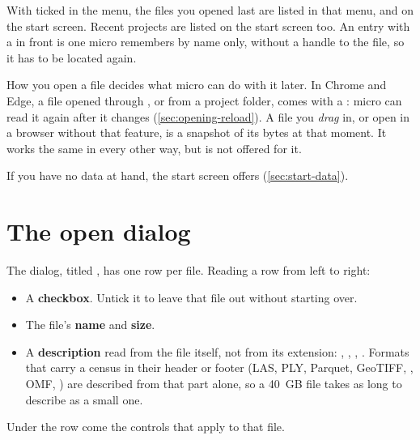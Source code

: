 With  ticked in the  menu, the files you opened last are listed in that menu, and on the start screen. Recent projects are listed on the start screen too. An entry with a  in front is one micro remembers by name only, without a handle to the file, so it has to be located again.

\begin{caution}
How you open a file decides what micro can do with it later. In Chrome and Edge, a file opened through , or from a project folder, comes with a : micro can read it again after it changes (\cref{sec:opening-reload}). A file you \emph{drag} in, or open in a browser without that feature, is a snapshot of its bytes at that moment. It works the same in every other way, but  is not offered for it.
\end{caution}

If you have no data at hand, the start screen offers  (\cref{sec:start-data}).

\section{The open dialog}\label{sec:opening-dialog}


The dialog, titled , has one row per file. Reading a row from left to right:

\begin{itemize}
\item A \textbf{checkbox}. Untick it to leave that file out without starting over.
\item The file's \textbf{name} and \textbf{size}.
\item A \textbf{description} read from the file itself, not from its extension: , , , . Formats that carry a census in their header or footer (LAS, PLY, Parquet, GeoTIFF, , OMF, ) are described from that part alone, so a 40~GB file takes as long to describe as a small one.
\end{itemize}

Under the row come the controls that apply to that file.

